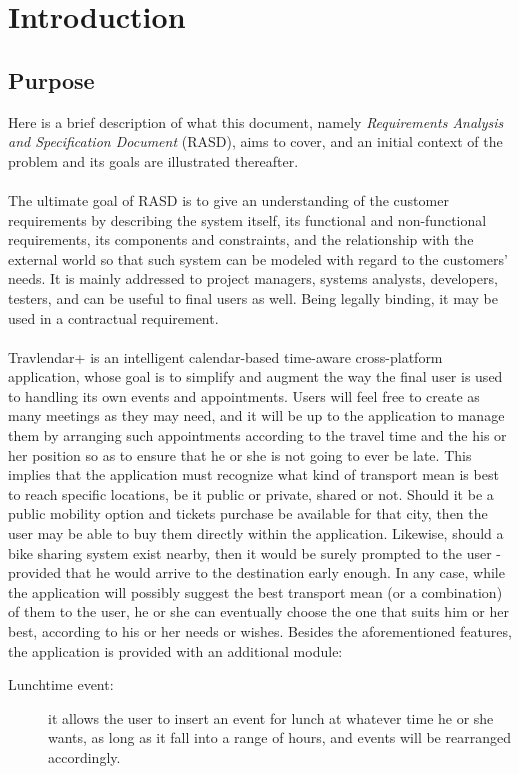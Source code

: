 \chapter{Introduction}
\label{cha:intro}

\section{Purpose}
\label{sec:purpose}
Here is a brief description of what this document, namely \textit{Requirements Analysis and Specification Document} (RASD), aims to cover, and an initial context of the problem and its goals are illustrated thereafter. \\\\
The ultimate goal of RASD is to give an understanding of the customer requirements by describing the system itself, its functional and non-functional requirements, its components and constraints, and the relationship with the external world so that such system can be modeled with regard to the customers' needs. It is mainly addressed to project managers, systems analysts, developers, testers, and can be useful to final users as well. Being legally binding, it may be used in a contractual requirement.\\\\
Travlendar+ is an intelligent calendar-based time-aware cross-platform application, whose goal is to simplify and augment the way the final user is used to handling its own events and appointments. Users will feel free to create as many meetings as they may need, and it will be up to the application to manage them by arranging such appointments according to the travel time and the his or her position so as to ensure that he or she is not going to ever be late. This implies that the application must recognize what kind of transport mean is best to reach specific locations, be it public or private, shared or not. Should it be a public mobility option and tickets purchase be available for that city, then the user may be able to buy them directly within the application. Likewise, should a bike sharing system exist nearby, then it would be surely prompted to the user - provided that he would arrive to the destination early enough. In any case, while the application will possibly suggest the best transport mean (or a combination) of them to the user, he or she can eventually choose the one that suits him or her best, according to his or her needs or wishes.
Besides the aforementioned features, the application is provided with an additional module:
\begin{description}
\item[Lunchtime event:] it allows the user to insert an event for lunch at whatever time he or she wants, as long as it fall into a range of hours, and events will be rearranged accordingly.
\end{description}

